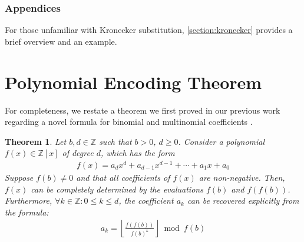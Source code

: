 \documentclass[11pt,reqno]{article}
\theoremstyle{plain}
\newtheorem{theorem}{Theorem}
\theoremstyle{definition}
\newcommand{\floor}[1]{\left\lfloor #1 \right\rfloor}
\begin{document}
\subsubsection{Appendices}
For those unfamiliar with Kronecker substitution, \cref{section:kronecker} provides a brief overview and an example.

\section{Polynomial Encoding Theorem} \label{section:encodingtheorem}
For completeness, we restate a theorem we first proved in our previous work regarding a novel formula for binomial and multinomial coefficients \cite{shunia2023simple}.

\begin{theorem} \label{theorem:encoding}
Let $b, d \in \mathbb{Z}$ such that $b > 0$, $d \geq 0$. Consider a polynomial $f(x) \in \mathbb{Z}[x]$ of degree $d$, which has the form
\begin{align*}
    f(x) = a_d x^d + a_{d-1} x^{d-1} + \cdots + a_1 x + a_0
\end{align*}
Suppose $f(b) \not= 0$ and that all coefficients of $f(x)$ are non-negative. Then, $f(x)$ can be completely determined by the evaluations $f(b)$ and $f(f(b))$. Furthermore, $\forall k \in \mathbb{Z} : 0 \leq k \leq d$, the coefficient $a_k$ can be recovered explicitly from the formula:
\begin{align*}
a_k = \floor{\frac{f(f(b))}{f(b)^{k}}} \bmod{f(b)}
\end{align*}
\end{theorem}
\end{document}
